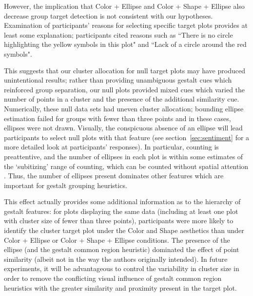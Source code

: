 \documentclass[12pt]{article}\usepackage[]{graphicx}\usepackage[]{color}
\newcommand{\newdo}[1]{\todo[inline, color=Lime]{#1}} %
\begin{document}
\begin{appendix}
However, the implication that Color + Ellipse and Color + Shape + Ellipse also decrease group target detection is not consistent with our hypotheses. Examination of participants' reasons for selecting specific target plots provides at least some explanation; participants cited reasons such as 
``There is no circle highlighting the yellow symbols in this plot" %
and 
``Lack of a circle around the red symbols".  %

This suggests that our cluster allocation for null target plots may have produced unintentional results; rather than providing unambiguous gestalt cues which reinforced group separation, our null plots provided mixed cues which varied the number of points in a cluster and the presence of the additional similarity cue. 
Numerically, these null data sets had uneven cluster allocation; bounding ellipse estimation failed for groups with fewer than three points and in these cases, ellipses were not drawn. 
Visually, the conspicuous absence of an ellipse will lead participants to select null plots with that feature (see section~\ref{sec:sentiment} for a more detailed look at participants' responses).
In particular, counting is preattentive, and the number of ellipses in each plot is within some estimates of the `subitizing' range of counting, which can be counted without spatial attention \citep{trick1994small}. Thus, the number of ellipses present dominates other features which are important for gestalt grouping heuristics. 


This effect actually provides some additional information as to the hierarchy of gestalt features: for plots displaying the same data (including at least one plot with cluster size of fewer than three points), participants were more likely to identify the cluster target plot under the Color and Shape aesthetics than under Color + Ellipse or Color + Shape + Ellipse conditions. 
The presence of the ellipse (and the gestalt common region heuristic) dominated the effect of point similarity (albeit not in the way the authors originally intended). 
In future experiments, it will be advantageous to control the variability in cluster size in order to remove the conflicting visual influence of gestalt common region heuristics with the greater similarity and proximity present in the target plot. 


\end{appendix}
\end{document}
